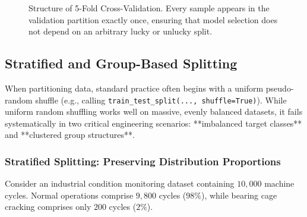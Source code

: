 \begin{figure}[htbp]
\caption{Structure of 5-Fold Cross-Validation. Every sample appears in the validation partition exactly once, ensuring that model selection does not depend on an arbitrary lucky or unlucky split.}\label{fig:kfold_diagram}
\end{figure}

\subsection{Stratified and Group-Based Splitting}\label{subsec:stratified_group_splitting}

When partitioning data, standard practice often begins with a uniform pseudo-random shuffle (e.g., calling \texttt{train\_test\_split(..., shuffle=True)}). While uniform random shuffling works well on massive, evenly balanced datasets, it fails systematically in two critical engineering scenarios: **imbalanced target classes** and **clustered group structures**.

\subsubsection{Stratified Splitting: Preserving Distribution Proportions}
Consider an industrial condition monitoring dataset containing $10{,}000$ machine cycles. Normal operations comprise $9{,}800$ cycles ($98\%$), while bearing cage cracking comprises only $200$ cycles ($2\%$). 

